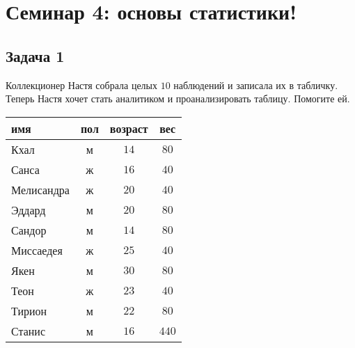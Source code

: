 \documentclass[12pt, a4paper, oneside]{article}
\begin{document}
\section*{Семинар 4: основы статистики! }

\subsection*{Задача 1}

Коллекционер Настя собрала целых $10$ наблюдений и записала их в табличку. Теперь Настя хочет стать аналитиком и проанализировать таблицу. Помогите ей. 

\begin{center}
	\begin{tabular}{lccc}
		\toprule
		имя & пол  & возраст  & вес  \\ \midrule
		Кхал & м  & $14$ &   $80$  \\
		Санса & ж & $16$ &  $40$  \\
		Мелисандра & ж & $20$ &  $40$   \\
		Эддард & м & $20$ &   $80$ \\
		Сандор & м & $14$ &   $80$ \\
		Миссаедея & ж & $25$ &   $40$\\
		Якен & м & $30$ &   $80$\\
		Теон & ж & $23$ &    $40$\\
		Тирион & м & $22$ &    $80$\\
		Станис & м & $16$  &    $440$\\ \bottomrule
	\end{tabular}	
\end{center}
\end{document}
